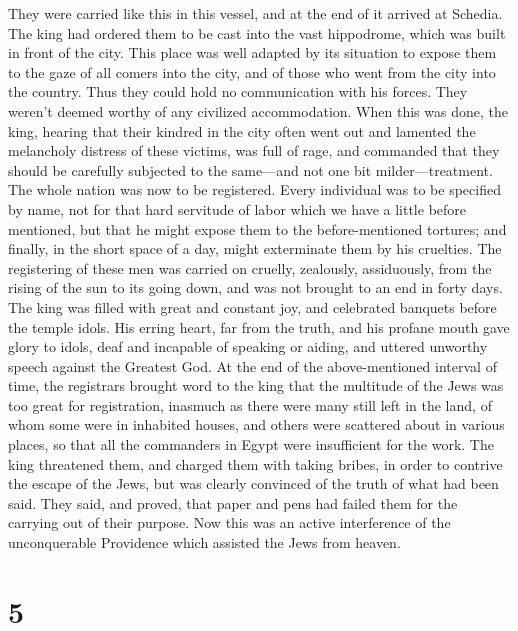  They were carried like this in this vessel, and at the
end of it arrived at Schedia. The king had ordered them to be cast into
the vast hippodrome, which was built in front of the city. This place
was well adapted by its situation to expose them to the gaze of all
comers into the city, and of those who went from the city into the
country. Thus they could hold no communication with his forces. They
weren't deemed worthy of any civilized accommodation. 
When this was done, the king, hearing that their kindred in the city
often went out and lamented the melancholy distress of these victims,
 was full of rage, and commanded that they should be
carefully subjected to the same---and not one bit milder---treatment.
 The whole nation was now to be registered. Every
individual was to be specified by name, not for that hard servitude of
labor which we have a little before mentioned, but that he might expose
them to the before-mentioned tortures; and finally, in the short space
of a day, might exterminate them by his cruelties.  The
registering of these men was carried on cruelly, zealously, assiduously,
from the rising of the sun to its going down, and was not brought to an
end in forty days.  The king was filled with great and
constant joy, and celebrated banquets before the temple idols. His
erring heart, far from the truth, and his profane mouth gave glory to
idols, deaf and incapable of speaking or aiding, and uttered unworthy
speech against the Greatest God.  At the end of the
above-mentioned interval of time, the registrars brought word to the
king that the multitude of the Jews was too great for registration,
 inasmuch as there were many still left in the land, of
whom some were in inhabited houses, and others were scattered about in
various places, so that all the commanders in Egypt were insufficient
for the work.  The king threatened them, and charged them
with taking bribes, in order to contrive the escape of the Jews, but was
clearly convinced of the truth of what had been said. 
They said, and proved, that paper and pens had failed them for the
carrying out of their purpose.  Now this was an active
interference of the unconquerable Providence which assisted the Jews
from heaven.

\hypertarget{section-4}{%
\section{5}\label{section-4}}

